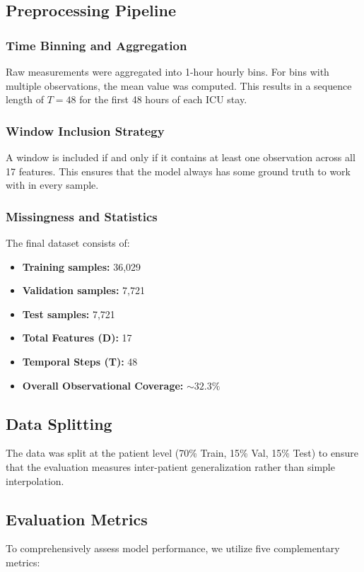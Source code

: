 \subsection{Preprocessing Pipeline}
\subsubsection{Time Binning and Aggregation}
Raw measurements were aggregated into 1-hour hourly bins. For bins with multiple observations, the mean value was computed. This results in a sequence length of $T=48$ for the first 48 hours of each ICU stay.

\subsubsection{Window Inclusion Strategy}
A window is included if and only if it contains at least one observation across all 17 features. This ensures that the model always has some ground truth to work with in every sample.

\subsubsection{Missingness and Statistics}
The final dataset consists of:
\begin{itemize}
    \item \textbf{Training samples:} 36,029
    \item \textbf{Validation samples:} 7,721
    \item \textbf{Test samples:} 7,721
    \item \textbf{Total Features (D):} 17
    \item \textbf{Temporal Steps (T):} 48
    \item \textbf{Overall Observational Coverage:} $\sim 32.3\%$
\end{itemize}

\subsection{Data Splitting}
The data was split at the patient level (70\% Train, 15\% Val, 15\% Test) to ensure that the evaluation measures inter-patient generalization rather than simple interpolation.

\subsection{Evaluation Metrics}
To comprehensively assess model performance, we utilize five complementary metrics:

